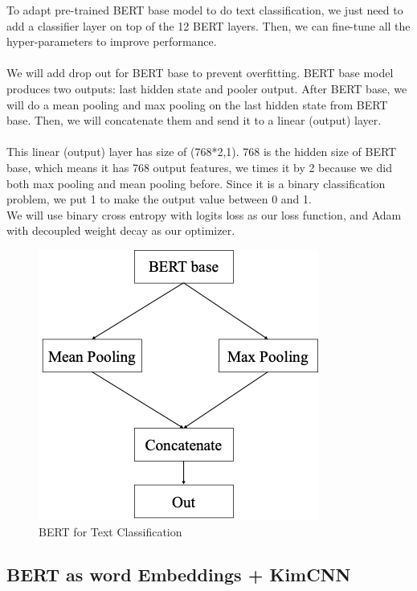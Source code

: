 \documentclass[11pt,a4paper]{article}
\begin{document}
To adapt pre-trained BERT base model to do text classification, we just need to add a classifier layer on top of the 12 BERT layers. Then, we can fine-tune all the hyper-parameters to improve performance.\\
\\
We will add drop out for BERT base to prevent overfitting. BERT base model produces two outputs: last hidden state and pooler output. After BERT base, we will do a mean pooling and max pooling on the last hidden state from BERT base. Then, we will concatenate them and send it to a linear (output) layer. \\
\\
This linear (output) layer has size of (768*2,1). 768 is the hidden size of BERT base, which means it has 768 output features, we times it by 2 because we did both max pooling and mean pooling before. Since it is a binary classification problem, we put 1 to make the output value between 0 and 1.\\

We will use binary cross entropy with logits loss as our loss function, and Adam with decoupled weight decay\cite{weight} as our optimizer.\\

\begin{figure}[!htb]
	\centering
	\includegraphics{figures/figure4.png}
	\caption{\label{fig:my-label} BERT for Text Classification}
\end{figure}



\subsection{BERT as word Embeddings + KimCNN}
\end{document}
